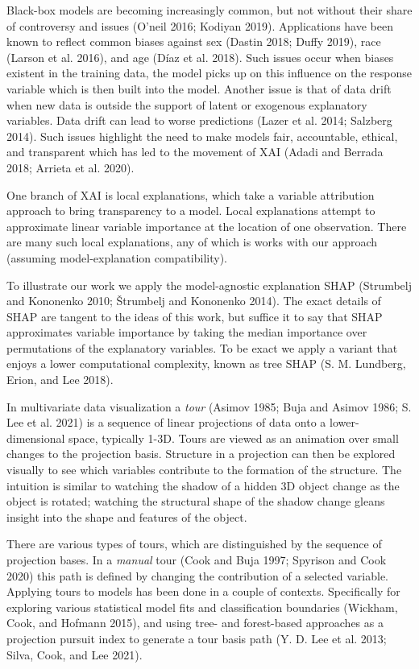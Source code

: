 \documentclass[
]{article}
\begin{document}
Black-box models are becoming increasingly common, but not without their share of controversy and issues (O'neil 2016; Kodiyan 2019). Applications have been known to reflect common biases against sex (Dastin 2018; Duffy 2019), race (Larson et al. 2016), and age (Díaz et al. 2018). Such issues occur when biases existent in the training data, the model picks up on this influence on the response variable which is then built into the model. Another issue is that of data drift when new data is outside the support of latent or exogenous explanatory variables. Data drift can lead to worse predictions (Lazer et al. 2014; Salzberg 2014). Such issues highlight the need to make models fair, accountable, ethical, and transparent which has led to the movement of XAI (Adadi and Berrada 2018; Arrieta et al. 2020).

One branch of XAI is local explanations, which take a variable attribution approach to bring transparency to a model. Local explanations attempt to approximate linear variable importance at the location of one observation. There are many such local explanations, any of which is works with our approach (assuming model-explanation compatibility).

To illustrate our work we apply the model-agnostic explanation SHAP (Strumbelj and Kononenko 2010; Štrumbelj and Kononenko 2014). The exact details of SHAP are tangent to the ideas of this work, but suffice it to say that SHAP approximates variable importance by taking the median importance over permutations of the explanatory variables. To be exact we apply a variant that enjoys a lower computational complexity, known as tree SHAP (S. M. Lundberg, Erion, and Lee 2018).

In multivariate data visualization a \emph{tour} (Asimov 1985; Buja and Asimov 1986; S. Lee et al. 2021) is a sequence of linear projections of data onto a lower-dimensional space, typically 1-3D. Tours are viewed as an animation over small changes to the projection basis. Structure in a projection can then be explored visually to see which variables contribute to the formation of the structure. The intuition is similar to watching the shadow of a hidden 3D object change as the object is rotated; watching the structural shape of the shadow change gleans insight into the shape and features of the object.

There are various types of tours, which are distinguished by the sequence of projection bases. In a \emph{manual} tour (Cook and Buja 1997; Spyrison and Cook 2020) this path is defined by changing the contribution of a selected variable. Applying tours to models has been done in a couple of contexts. Specifically for exploring various statistical model fits and classification boundaries (Wickham, Cook, and Hofmann 2015), and using tree- and forest-based approaches as a projection pursuit index to generate a tour basis path (Y. D. Lee et al. 2013; Silva, Cook, and Lee 2021).
\end{document}
